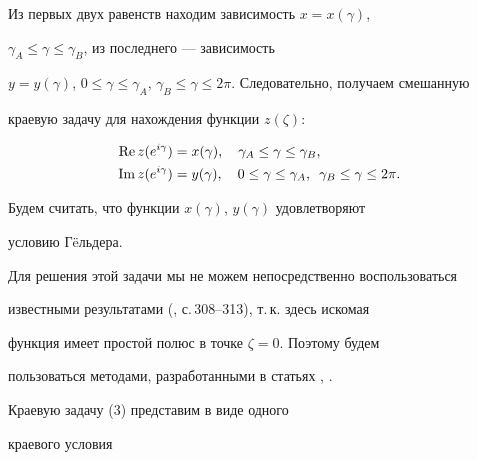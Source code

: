 Из первых двух равенств находим зависимость $x=x(\gamma)$,


$\gamma_{A}\leq\gamma\leq\gamma_{B}$, из последнего --- зависимость


$y=y(\gamma)$, $0\leq\gamma\leq\gamma_{A},\,


\gamma_{B}\leq\gamma\leq 2\pi$. Следовательно, получаем смешанную


краевую задачу для нахождения функции $z(\zeta)$:


\begin{equation} \label{2.3}


\begin{split}


\re z(e^{i\gamma})&=


x(\gamma),\quad\gamma_{A}\leq\gamma\leq\gamma_{B},\\


\im z(e^{i\gamma})&=


y(\gamma),\quad 0\leq\gamma\leq\gamma_{A},\ \,\gamma_{B}\leq\gamma


\leq2\pi.


\end{split}


\end{equation}


Будем считать, что функции $x(\gamma)$, $y(\gamma)$ удовлетворяют


условию Г\"eльдера.





Для решения этой задачи мы не можем непосредственно воспользоваться


известными результатами (\cite{Mu}, с.\,308--313), т.\,к. здесь искомая


функция имеет простой полюс в точке $\zeta=0$. Поэтому будем 


пользоваться методами, разработанными в статьях \cite{AS}, \cite{SSh}. 


Краевую задачу (3) представим в виде одного 


краевого условия


